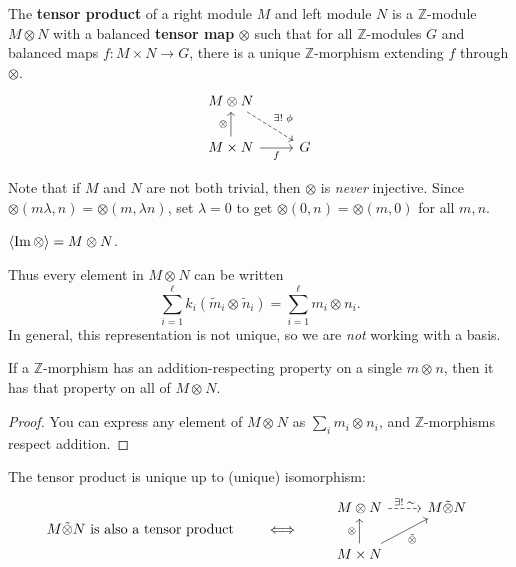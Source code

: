 \documentclass[twoside,10pt]{report}
\begin{document}
\begin{defn}[]
The \textbf{tensor product} of a right module $M$ and left module $N$ is a $\mathbb{Z}$-module $M \otimes N$ with a balanced \textbf{tensor map} $\otimes$ such that for all $\mathbb{Z}$-modules $G$ and balanced maps $f:M\times N\to G$, there is a unique $\mathbb{Z}$-morphism extending $f$ through $\otimes$.
\[
\begin{tikzcd}
	M\otimes N \arrow[dr,dashed,"\exists!\;\phi"] \\
	M\times N \uar{\otimes}\rar["f"'] & G
\end{tikzcd}
\]
\end{defn}

Note that if $M$ and $N$ are not both trivial, then $\otimes$ is \textit{never} injective. Since $\otimes(m \lambda,n) = \otimes(m,\lambda n)$, set $\lambda=0$ to get $\otimes(0,n)=\otimes(m,0)$ for all $m,n$.

\begin{prop}
$\langle \operatorname{Im} \otimes \rangle=M \otimes N$.
\end{prop}
Thus every element in $M \otimes_{}N$ can be written
\[
	\sum_{i=1}^{\ell} k_i (\tilde{m}_{i}\otimes_{}\tilde{n}_{i}) = \sum_{i=1}^{\ell} m_i \otimes_{}n_i.
\] 
In general, this representation is not unique, so we are \textit{not} working with a basis.

\begin{lem}
If a $\mathbb{Z}$-morphism has an addition-respecting property on a single $m \otimes_{}n$, then it has that property on all of $M \otimes_{}N$.
\end{lem}
\begin{proof}
	You can express any element of $M \otimes_{}N$ as $\sum_i m_i \otimes_{}n_i$, and $\mathbb{Z}$-morphisms respect addition.
\end{proof}

\begin{thrm}[Uniqueness]
	The tensor product is unique up to (unique) isomorphism:
	\begin{equation*}
        \begin{aligned}[c]
		M \tilde{\otimes} N \text{ is also a tensor product}
        \end{aligned}
        \qquad\iff\qquad
        \begin{aligned}[c]
		\begin{tikzcd}
			M \otimes N \rar[dashed]{\exists!\;\sim} & M \tilde{\otimes} N \\
			M\times N \uar{\otimes}\arrow[ur,"\tilde{\otimes}"']
		\end{tikzcd}
        \end{aligned}
	\end{equation*}
\end{thrm}
\end{document}
